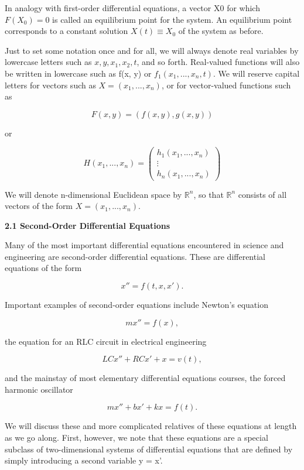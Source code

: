 \documentclass{article}
\begin{document}
In analogy with first-order differential equations, a vector X0 for which
$F(X_0) = 0$ is called an equilibrium point for the system. An equilibrium point
corresponds to a constant solution $X(t) \equiv X_0$ of the system as before.

Just to set some notation once and for all, we will always denote real variables
by lowercase letters such as $x, y, x_1, x_2, t$, and so forth. Real-valued functions
will also be written in lowercase such as f(x, y) or $f_1(x_1, ..., x_n, t)$. We will
reserve capital letters for vectors such as $X = (x_1, ..., x_n)$, or for vector-valued
functions such as

\[
F(x,y) = (f(x,y), g(x,y))
\]

or

\[
H(x_1, ..., x_n) = \begin{pmatrix}
h_1(x_1, ..., x_n) \\
\vdots \\
h_n(x_1, ..., x_n)
\end{pmatrix} 
\]

We will denote n-dimensional Euclidean space by $\mathbb{R}^n$, so that $\mathbb{R}^n$ consists of
all vectors of the form $X = (x_1, ..., x_n)$.

\hfill

\textbf{2.1 Second-Order Differential Equations}

\hfill

Many of the most important differential equations encountered in science
and engineering are second-order differential equations. These are differential
equations of the form

\[
x'' = f(t, x, x').
\]

Important examples of second-order equations include Newton’s equation

\[
mx''= f (x),
\]

the equation for an RLC circuit in electrical engineering

\[
LC x'' + RC x' + x = v(t),
\]

and the mainstay of most elementary differential equations courses, the forced
harmonic oscillator

\[
m x'' + b x' + kx = f (t).
\]

We will discuss these and more complicated relatives of these equations at length as we go along. First, however, we note that these equations are a special subclass of two-dimensional systems of differential equations that are defined by simply introducing a second variable y = x'.
\end{document}

